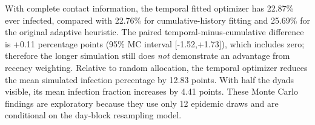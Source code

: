 With complete contact information, the temporal fitted optimizer has 22.87\% ever infected, compared with 22.76\% for cumulative-history fitting and 25.69\% for the original adaptive heuristic. The paired temporal-minus-cumulative difference is +0.11 percentage points (95\% MC interval [-1.52,+1.73]), which includes zero; therefore the longer simulation still does \emph{not} demonstrate an advantage from recency weighting. Relative to random allocation, the temporal optimizer reduces the mean simulated infection percentage by 12.83 points. With half the dyads visible, its mean infection fraction increases by 4.41 points. These Monte Carlo findings are exploratory because they use only 12 epidemic draws and are conditional on the day-block resampling model.
